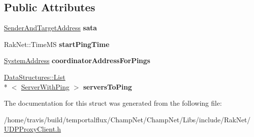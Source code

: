 \subsection*{Public Attributes}
\begin{DoxyCompactItemize}
\item 
\hypertarget{struct_rak_net_1_1_u_d_p_proxy_client_1_1_ping_server_group_a50715447ae4e344a1f6fe7181e8417b8}{\hyperlink{struct_rak_net_1_1_u_d_p_proxy_client_1_1_sender_and_target_address}{Sender\-And\-Target\-Address} {\bfseries sata}}\label{struct_rak_net_1_1_u_d_p_proxy_client_1_1_ping_server_group_a50715447ae4e344a1f6fe7181e8417b8}

\item 
\hypertarget{struct_rak_net_1_1_u_d_p_proxy_client_1_1_ping_server_group_a47d9629a2ebdeffc29e7088f078938ea}{Rak\-Net\-::\-Time\-M\-S {\bfseries start\-Ping\-Time}}\label{struct_rak_net_1_1_u_d_p_proxy_client_1_1_ping_server_group_a47d9629a2ebdeffc29e7088f078938ea}

\item 
\hypertarget{struct_rak_net_1_1_u_d_p_proxy_client_1_1_ping_server_group_ae57c4909175bb1947afadc55d0b17ca1}{\hyperlink{struct_rak_net_1_1_system_address}{System\-Address} {\bfseries coordinator\-Address\-For\-Pings}}\label{struct_rak_net_1_1_u_d_p_proxy_client_1_1_ping_server_group_ae57c4909175bb1947afadc55d0b17ca1}

\item 
\hypertarget{struct_rak_net_1_1_u_d_p_proxy_client_1_1_ping_server_group_acd7334c705149c465305cb3b837ca7ab}{\hyperlink{class_data_structures_1_1_list}{Data\-Structures\-::\-List}\\*
$<$ \hyperlink{struct_rak_net_1_1_u_d_p_proxy_client_1_1_server_with_ping}{Server\-With\-Ping} $>$ {\bfseries servers\-To\-Ping}}\label{struct_rak_net_1_1_u_d_p_proxy_client_1_1_ping_server_group_acd7334c705149c465305cb3b837ca7ab}

\end{DoxyCompactItemize}


The documentation for this struct was generated from the following file\-:\begin{DoxyCompactItemize}
\item 
/home/travis/build/temportalflux/\-Champ\-Net/\-Champ\-Net/\-Libs/include/\-Rak\-Net/\hyperlink{_u_d_p_proxy_client_8h}{U\-D\-P\-Proxy\-Client.\-h}\end{DoxyCompactItemize}
